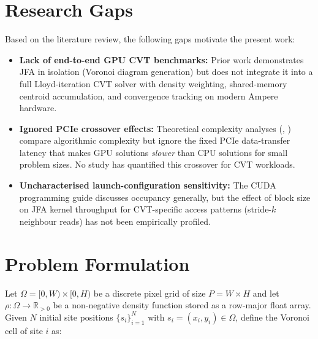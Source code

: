 \documentclass[12pt,a4paper]{article}
\begin{document}
\section{Research Gaps}

Based on the literature review, the following gaps motivate the present work:

\begin{itemize}
    \item \textbf{Lack of end-to-end GPU CVT benchmarks:}  Prior work
          \cite{rong2006jump} demonstrates JFA in isolation (Voronoi diagram
          generation) but does not integrate it into a full Lloyd-iteration CVT
          solver with density weighting, shared-memory centroid accumulation,
          and convergence tracking on modern Ampere hardware.

    \item \textbf{Ignored PCIe crossover effects:}  Theoretical complexity
          analyses (\cite{du1999centroidal}, \cite{lloyd1982least}) compare
          algorithmic complexity but ignore the fixed PCIe data-transfer latency
          that makes GPU solutions \textit{slower} than CPU solutions for small
          problem sizes.  No study has quantified this crossover for CVT
          workloads.

    \item \textbf{Uncharacterised launch-configuration sensitivity:}
          The CUDA programming guide \cite{nvidia2023cuda} discusses occupancy
          generally, but the effect of block size on JFA kernel throughput for
          CVT-specific access patterns (stride-$k$ neighbour reads) has not been
          empirically profiled.
\end{itemize}

\newpage
\section{Problem Formulation}

Let $\Omega = [0,W) \times [0,H)$ be a discrete pixel grid of size
$P = W \times H$ and let $\rho : \Omega \rightarrow \mathbb{R}_{>0}$ be a
non-negative density function stored as a row-major float array.  Given $N$
initial site positions $\{s_i\}_{i=1}^{N}$ with $s_i = (x_i, y_i) \in \Omega$,
define the Voronoi cell of site $i$ as:
\end{document}
